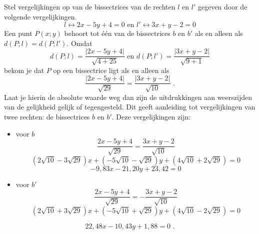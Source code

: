 \begin{voorbeeld}
	Stel vergelijkingen op van de bissectrices van de rechten $l$ en $l'$ gegeven door de volgende vergelijkingen.
\[
l \leftrightarrow 2x-5y+4=0 \text { en } l' \leftrightarrow3x+y-2=0 
\]
Een punt $P(x;y)$ behoort tot \'e\'en van de bissectrices $b$ en $b'$ als en alleen als $d(P;l)=d(P;l')$.
Omdat
\[
d(P;l)=\frac { \vert 2x-5y+4 \vert }{\sqrt {4 + 25}} \text { en } d(P;l')=\frac { \vert 3x+y-2 \vert }{\sqrt {9+1}}
\]
bekom je dat $P$ op een bissectrice ligt als en alleen als
\[
\frac { \vert 2x-5y+4 \vert }{\sqrt {29}}=\frac { \vert 3x+y-2 \vert }{\sqrt {10}} \text { .}
\]
Laat je hierin de absolute waarde weg dan zijn de uitdrukkingen aan weerszijden van de gelijkheid gelijk of tegengesteld.
Dit geeft aanleiding tot vergelijkingen van twee rechten: de bissectrices $b$ en $b'$.
Deze vergelijkingen zijn:
\begin{itemize}
\item  voor $b$
\[
\frac {2x-5y+4}{\sqrt {29}}=\frac {3x+y-2}{\sqrt {10 }}
\]
\[
(2\sqrt {10}-3\sqrt {29})x+(-5\sqrt {10}-\sqrt {29})y+(4\sqrt {10}+2\sqrt {29})=0
\]
\[
-9,83x-21,20y+23,42=0
\]
\item voor $b'$
\[
\frac {2x-5y+4}{\sqrt {29}}=-\frac {3x+y-2}{\sqrt {10}}
\]
\[
(2\sqrt {10}+3\sqrt {29})x+(-5\sqrt{10}+\sqrt{29})y+(4\sqrt{10}-2\sqrt{29})=0
\]
\end{itemize}
\[
22,48x-10,43y+1,88=0 \text { .}
\]

\end{voorbeeld}